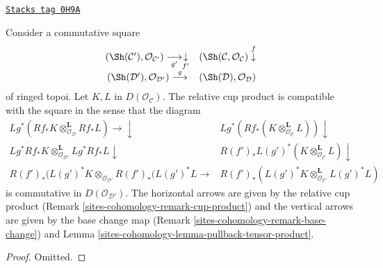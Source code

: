 \begin{lemma}
\label{sites-cohomology-lemma-base-change-cup-product}
\href{https://stacks.math.columbia.edu/tag/0H9A}{\texttt{Stacks tag 0H9A}}

Consider a commutative square
$$
\begin{array}{cc}(\Sh(\mathcal{C}'), \mathcal{O}_{\mathcal{C}'}) \underset{g'}{\longrightarrow}\underset{f'}{\downarrow} & (\Sh(\mathcal{C}, \mathcal{O}_{\mathcal{C}}) \overset{f}{\downarrow} \\ (\Sh(\mathcal{D}'), \mathcal{O}_{\mathcal{D}'}) \overset{g}{\longrightarrow} & (\Sh(\mathcal{D}), \mathcal{O}_{\mathcal{D}})\end{array}
$$
of ringed topoi. Let $K, L$ in $D(\mathcal{O}_{\mathcal{C}})$.
The relative cup product is compatible with the square
in the sense that the diagram
$$
\begin{array}{cc}Lg^*(Rf_*K \otimes_{\mathcal{O}_{\mathcal{D}}}^\mathbf{L} Rf_*L)
\longrightarrow\downarrow & Lg^*(Rf_*(K \otimes_{\mathcal{O}_{\mathcal{C}}}^\mathbf{L} L)) \downarrow \\ Lg^*Rf_*K \otimes_{\mathcal{O}_{\mathcal{D}'}}^\mathbf{L} Lg^*Rf_*L \downarrow & R(f')_*L(g')^*(K \otimes_{\mathcal{O}_{\mathcal{C}}}^\mathbf{L} L) \downarrow \\ R(f')_*(L(g')^*K \otimes_{\mathcal{O}_{\mathcal{D}'}} R(f')_*(L(g')^*L \longrightarrow & R(f')_*(L(g')^*K \otimes_{\mathcal{O}_{\mathcal{C}'}}^\mathbf{L} L(g')^*L)\end{array}
$$
is commutative in $D(\mathcal{O}_{\mathcal{D}'})$.
The horizontal arrows are given
by the relative cup product (Remark \ref{sites-cohomology-remark-cup-product})
and the vertical arrows are given
by the base change map (Remark \ref{sites-cohomology-remark-base-change})
and Lemma \ref{sites-cohomology-lemma-pullback-tensor-product}.
\end{lemma}

\begin{proof}
Omitted.
\end{proof}

